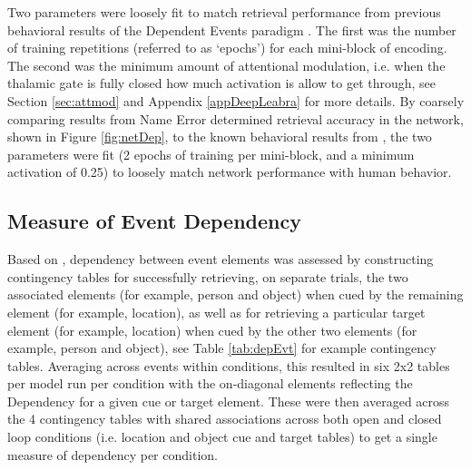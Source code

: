 \documentclass[11pt, titlepage, twoside]{article}
\begin{document}
Two parameters were loosely fit to match retrieval performance from previous behavioral results of the Dependent Events paradigm \cite{HornerBisbyBushEtAl15,HornerBurgess14}.  The first was the number of training repetitions (referred to as `epochs') for each mini-block of encoding.  The second was the minimum amount of attentional modulation, i.e. when the thalamic gate is fully closed how much activation is allow to get through, see Section \ref{sec:attmod} and Appendix \ref{appDeepLeabra} for more details.  By coarsely comparing results from Name Error determined retrieval accuracy in the network, shown in Figure \ref{fig:netDep}, to the known behavioral results from \textcite{HornerBisbyBushEtAl15,HornerBurgess14}, the two parameters were fit (2 epochs of training per mini-block, and a minimum activation of 0.25) to loosely match network performance with human behavior.

\subsection{Measure of Event Dependency} 
\label{sec:CalcDep}
Based on \textcite{HornerBisbyBushEtAl15}, dependency between event elements was assessed by constructing contingency tables for successfully retrieving, on separate trials, the two associated elements (for example, person and object) when cued by the remaining element (for example, location), as well as for retrieving a particular target element (for example, location) when cued by the other two elements (for example, person and object), see Table \ref{tab:depEvt} for example contingency tables. Averaging across events within conditions, this resulted in six 2x2 tables per model run per condition with the on-diagonal elements reflecting the Dependency for a given cue or target element.  These were then averaged across the 4 contingency tables with shared associations across both open and closed loop conditions (i.e. location and object cue and target tables) to get a single measure of dependency per condition.
\end{document}
